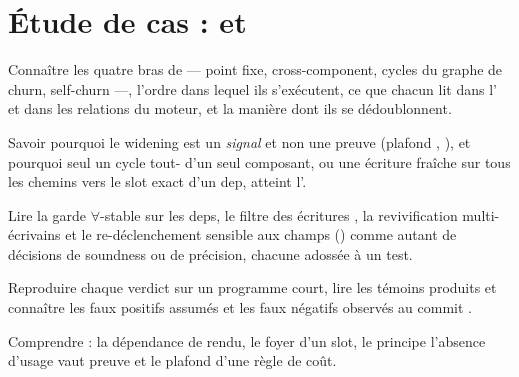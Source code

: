\chapter{Étude de cas :  et }
\label{chap:infinite-loop}

\begin{objectifs}
  \item Connaître les quatre bras de  --- point fixe, cross-component, cycles du graphe de churn, self-churn ---, l'ordre dans lequel ils s'exécutent, ce que chacun lit dans l' et dans les relations du moteur, et la manière dont ils se dédoublonnent.
  \item Savoir pourquoi le widening est un \emph{signal} et non une preuve (plafond \Warning, ), et pourquoi seul un cycle tout- d'un seul composant, ou une écriture fraîche sur tous les chemins vers le slot exact d'un dep, atteint l'\Error.
  \item Lire la garde $\forall$-stable sur les deps, le filtre des écritures , la revivification multi-écrivains et le re-déclenchement sensible aux champs () comme autant de décisions de soundness ou de précision, chacune adossée à un test.
  \item Reproduire chaque verdict sur un programme court, lire les témoins produits et connaître les faux positifs assumés et les faux négatifs observés au commit \snapshotCommit.
  \item Comprendre  : la dépendance de rendu, le foyer d'un slot, le principe \og l'absence d'usage vaut preuve\fg{} et le plafond \Warning{} d'une règle de coût.
\end{objectifs}

